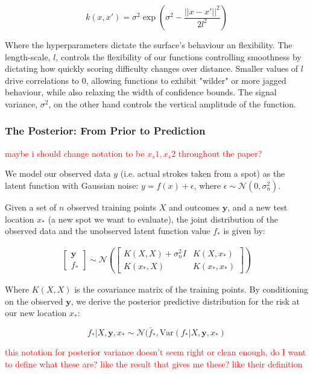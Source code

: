 \documentclass[11pt, letterpaper]{article}
\begin{document}
$$k(x,x') = \sigma^2 \exp\left(\sigma^2-\frac{||x-x'||^2}{2l^2}\right)$$

Where the hyperparameters dictate the surface's behaviour an flexibility. The length-scale, $l$, controls the flexibility of our functions controlling smoothness by dictating how quickly scoring difficulty changes over distance. Smaller values of $l$ drive correlations to 0, allowing functions to exhibit "wilder" or more jagged behaviour, while also relaxing the width of confidence bounds. The signal variance, $\sigma^2$, on the other hand controls the vertical amplitude of the function. 

\subsubsection{The Posterior: From Prior to Prediction}

\textcolor{red}{maybe i should change notation to be $x_s1, x_s2$ throughout the paper?}

We model our observed data $y$ (i.e. actual strokes taken from a spot) as the latent function with Gaussian noise: $y = f(x) + \epsilon$, where $\epsilon \sim \mathcal{N}(0, \sigma^2_n)$. 

Given a set of $n$ observed training points $X$ and outcomes $\mathbf{y}$, and a new test location $x_*$ (a new spot we want to evaluate), the joint distribution of the observed data and the unobserved latent function value $f_*$ is given by:

\begin{align*}
    \begin{bmatrix}
        \mathbf{y}\\
        f_*
    \end{bmatrix} \sim 
    \mathcal{N}\left (\begin{bmatrix}
        K(X,X) + \sigma^2_nI & K(X,x_*) \\
        K(x_*, X) & K(x_*, x_*)
    \end{bmatrix}\right)
\end{align*}

Where $K(X,X)$ is the covariance matrix of the training points. By conditioning on the observed $\mathbf{y}$, we derive the posterior predictive distribution for the risk at our new location $x_*$:

\[f_* |X, \mathbf{y}, x_* \sim \mathcal{N}(\bar f_*, \text{Var}(f_* | X, \mathbf{y}, x_*)\]

\textcolor{red}{this notation for posterior variance doesn't seem right or clean enough, do I want to define what these are? like the result that gives me these? like their definition}
\end{document}

